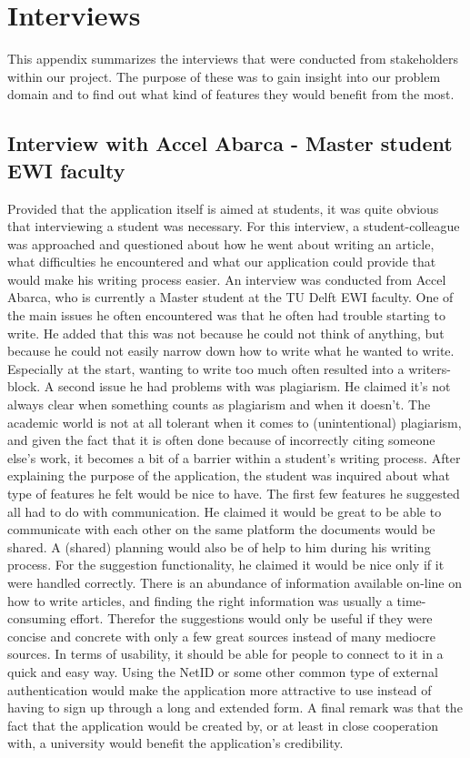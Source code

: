 \chapter{Interviews}   
\label{interview} 
 This appendix summarizes the interviews that were conducted from stakeholders within our project. The purpose of these was to gain insight into our problem domain and to find out what kind of features they would benefit from the most.

\section{Interview with Accel Abarca - Master student EWI faculty}
Provided that the application itself is aimed at students, it was quite obvious that interviewing a student was necessary. For this interview, a student-colleague was approached and questioned about how he went about writing an article, what difficulties he encountered and what our application could provide that would make his writing process easier. An interview was conducted from Accel Abarca, who is currently a Master student at the TU Delft EWI faculty.
One of the main issues he often encountered was that he often had trouble starting to write. He added that this was not because he could not think of anything, but because he could not easily narrow down how to write what he wanted to write. Especially at the start, wanting to write too much often resulted into a writers-block.
A second issue he had problems with was plagiarism. He claimed it's not always clear when something counts as plagiarism and when it doesn't. The academic world is not at all tolerant when it comes to (unintentional) plagiarism, and given the fact that it is often done because of incorrectly citing someone else's work, it becomes a bit of a barrier within a student's writing process.
After explaining the purpose of the application, the student was inquired about what type of features he felt would be nice to have. The first few features he suggested all had to do with communication. He claimed it would be great to be able to communicate with each other on the same platform the documents would be shared. A (shared) planning would also be of help to him during his writing process. For the suggestion functionality, he claimed it would be nice only if it were handled correctly. There is an abundance of information available on-line on how to write articles, and finding the right information was usually a time-consuming effort. Therefor the suggestions would only be useful if they were concise and concrete with only a few great sources instead of many mediocre sources. 
In terms of usability, it should be able for people to connect to it in a quick and easy way. Using the NetID or some other common type of external authentication would make the application more attractive to use instead of having to sign up through a long and extended form. A final remark was that the fact that the application would be created by, or at least in close cooperation with, a university would benefit the application's credibility.

